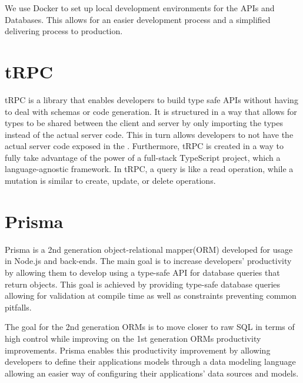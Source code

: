 We use Docker to set up local development environments for the APIs and Databases. This allows for an easier development process and a simplified delivering process to production.

\section*{tRPC}
tRPC is a library that enables developers to build type safe APIs without having to deal with schemas or code generation. 
It is structured in a way that allows for types to be shared between the client and server by only importing the types instead of the actual server code. 
This in turn allows developers to not have the actual server code exposed in the \frontend{}. 
Furthermore, tRPC is created in a way to fully take advantage of the power of a full-stack TypeScript project, which a language-agnostic framework\cite{tRPC}.
In tRPC, a query is like a read operation, while a mutation is similar to create, update, or delete operations.

\section*{Prisma}
Prisma is a 2nd generation object-relational mapper(ORM) developed for usage in Node.js and \typescript{} back-ends. 
The main goal is to increase developers' productivity by allowing them to develop using a type-safe API for database queries that return \javascript{} objects. 
This goal is achieved by providing type-safe database queries allowing for validation at compile time as well as constraints preventing common pitfalls\cite{Prisma_Why}.

The goal for the 2nd generation ORMs is to move closer to raw SQL in terms of high control while improving on the 1st generation ORMs productivity improvements. 
Prisma enables this productivity improvement by allowing developers to define their applications models through a data modeling language allowing an easier way of configuring their applications' data sources and models\cite{Prisma_Doc}.

